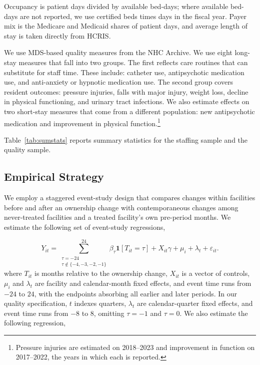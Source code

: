 \documentclass[12pt]{article}
\begin{document}
Occupancy is patient days divided by available bed-days; where available bed-days are not reported, we use certified beds times days in the fiscal year. Payer mix is the Medicare and Medicaid shares of patient days, and average length of stay is taken directly from HCRIS.

We use MDS-based quality measures from the NHC Archive. We use eight long-stay measures that fall into two groups. The first reflects care routines that can substitute for staff time. These include: catheter use, antipsychotic medication use, and anti-anxiety or hypnotic medication use. The second group covers resident outcomes: pressure injuries, falls with major injury, weight loss, decline in physical functioning, and urinary tract infections. We also estimate effects on two short-stay measures that come from a different population: new antipsychotic medication and improvement in physical function.\footnote{Pressure injuries are estimated on 2018–2023 and improvement in function on 2017–2022, the years in which each is reported.}

Table~\ref{tab:sumstats} reports summary statistics for the staffing sample and the quality sample.


\FloatBarrier

\subsection{Empirical Strategy}

We employ a staggered event-study design that compares changes within facilities before and after an ownership change with contemporaneous changes among never-treated facilities and a treated facility's own pre-period months. We estimate the following set of event-study regressions,

\begin{equation}
\label{eq:event-study}
Y_{it}
=
\sum_{\substack{\tau=-24\\ \tau\notin\{-4,-3,-2,-1\}}}^{24}
\beta_{\tau}\mathbf{1}[T_{it}=\tau]
+
X_{it}\gamma
+
\mu_i
+
\lambda_t
+
\varepsilon_{it}.
\end{equation}
where \(T_{it}\) is months relative to the ownership change, \(X_{it}\) is a vector of controls, \(\mu_i\) and \(\lambda_t\) are facility and calendar-month fixed effects, and event time runs from \(-24\) to \(24\), with the endpoints absorbing all earlier and later periods. In our quality specification, \(t\) indexes quarters, \(\lambda_t\) are calendar-quarter fixed effects, and event time runs from \(-8\) to \(8\), omitting \(\tau=-1\) and \(\tau=0\). We also estimate the following regression,
\end{document}
